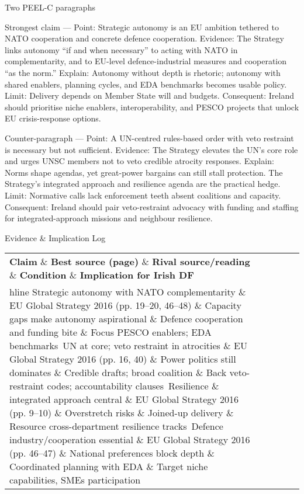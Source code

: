 Two PEEL-C paragraphs

Strongest claim — Point: Strategic autonomy is an EU ambition tethered to NATO cooperation and concrete defence cooperation.
Evidence: The Strategy links autonomy “if and when necessary” to acting with NATO in complementarity, and to EU-level defence-industrial measures and cooperation “as the norm.”
Explain: Autonomy without depth is rhetoric; autonomy with shared enablers, planning cycles, and EDA benchmarks becomes usable policy.
Limit: Delivery depends on Member State will and budgets.
Consequent: Ireland should prioritise niche enablers, interoperability, and PESCO projects that unlock EU crisis-response options.

Counter-paragraph — Point: A UN-centred rules-based order with veto restraint is necessary but not sufficient.
Evidence: The Strategy elevates the UN’s core role and urges UNSC members not to veto credible atrocity responses.
Explain: Norms shape agendas, yet great-power bargains can still stall protection. The Strategy’s integrated approach and resilience agenda are the practical hedge.
Limit: Normative calls lack enforcement teeth absent coalitions and capacity.
Consequent: Ireland should pair veto-restraint advocacy with funding and staffing for integrated-approach missions and neighbour resilience.

Evidence \& Implication Log

\begin{tabular}{p{3.2cm}p{4.2cm}p{3.6cm}p{3.2cm}p{4.2cm}}
	\textbf{Claim} \& \textbf{Best source (page)} \& \textbf{Rival source/reading} \& \textbf{Condition} \& \textbf{Implication for Irish DF}\\hline
	Strategic autonomy with NATO complementarity \& EU Global Strategy 2016 (pp. 19–20, 46–48) \& Capacity gaps make autonomy aspirational \& Defence cooperation and funding bite \& Focus PESCO enablers; EDA benchmarks\
	UN at core; veto restraint in atrocities \& EU Global Strategy 2016 (pp. 16, 40) \& Power politics still dominates \& Credible drafts; broad coalition \& Back veto-restraint codes; accountability clauses\
	Resilience \& integrated approach central \& EU Global Strategy 2016 (pp. 9–10) \& Overstretch risks \& Joined-up delivery \& Resource cross-department resilience tracks\
	Defence industry/cooperation essential \& EU Global Strategy 2016 (pp. 46–47) \& National preferences block depth \& Coordinated planning with EDA \& Target niche capabilities, SMEs participation\
\end{tabular}

